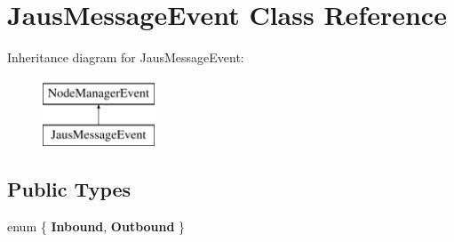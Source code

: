 \hypertarget{class_jaus_message_event}{\section{\-Jaus\-Message\-Event \-Class \-Reference}
\label{class_jaus_message_event}
}
\-Inheritance diagram for \-Jaus\-Message\-Event\-:\begin{figure}[H]
\begin{center}
\leavevmode
\includegraphics[height=2.000000cm]{class_jaus_message_event}
\end{center}
\end{figure}
\subsection*{\-Public \-Types}
\begin{DoxyCompactItemize}
\item 
enum \{ {\bfseries \-Inbound}, 
{\bfseries \-Outbound}
 \}
\end{DoxyCompactItemize}
